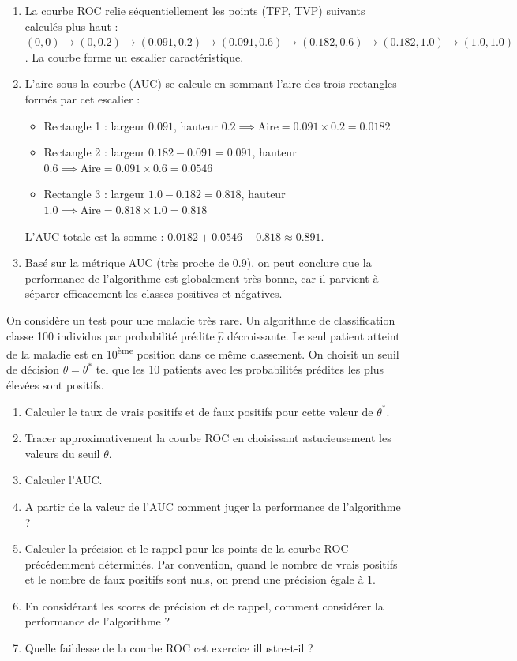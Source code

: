 \documentclass[]{../exercices}
\begin{document}
\begin{solution}
\begin{enumerate}
		\item La courbe ROC relie séquentiellement les points (TFP, TVP) suivants calculés plus haut : 
		$(0, 0) \to (0, 0.2) \to (0.091, 0.2) \to (0.091, 0.6) \to (0.182, 0.6) \to (0.182, 1.0) \to (1.0, 1.0)$.
		La courbe forme un escalier caractéristique.

		\item L'aire sous la courbe (AUC) se calcule en sommant l'aire des trois rectangles formés par cet escalier :
		\begin{itemize}
			\item Rectangle 1 : largeur $0.091$, hauteur $0.2 \implies \text{Aire} = 0.091 \times 0.2 = 0.0182$
			\item Rectangle 2 : largeur $0.182 - 0.091 = 0.091$, hauteur $0.6 \implies \text{Aire} = 0.091 \times 0.6 = 0.0546$
			\item Rectangle 3 : largeur $1.0 - 0.182 = 0.818$, hauteur $1.0 \implies \text{Aire} = 0.818 \times 1.0 = 0.818$
		\end{itemize}
		L'AUC totale est la somme : $0.0182 + 0.0546 + 0.818 \approx 0.891$.

		\item Basé sur la métrique AUC (très proche de 0.9), on peut conclure que la performance de l'algorithme est globalement très bonne, car il parvient à séparer efficacement les classes positives et négatives.
	\end{enumerate}
\end{solution}

	\begin{exercice}
		On considère un test pour une maladie très rare. Un algorithme de classification classe 100 individus par probabilité prédite $\hat{p}$ décroissante. Le seul patient atteint de la maladie est en 10\textsuperscript{ème} position dans ce même classement. On choisit un seuil de décision $\theta = \theta^*$ tel que les 10 patients avec les probabilités prédites les plus élevées sont positifs.
		\begin{enumerate}
			\item Calculer le taux de vrais positifs et de faux positifs pour cette valeur de $\theta^*$.
			\item Tracer approximativement la courbe ROC en choisissant astucieusement les valeurs du seuil $\theta$.
			\item Calculer l'AUC.
			\item A partir de la valeur de l'AUC comment juger la performance de l'algorithme ?
			\item Calculer la précision et le rappel pour les points de la courbe ROC précédemment déterminés. Par convention, quand le nombre de vrais positifs et le nombre de faux positifs sont nuls, on prend une précision égale à 1.
			\item En considérant les scores de précision et de rappel, comment considérer la performance de l'algorithme ?
			\item Quelle faiblesse de la courbe ROC cet exercice illustre-t-il ?
		\end{enumerate}
	\end{exercice}
\end{document}
